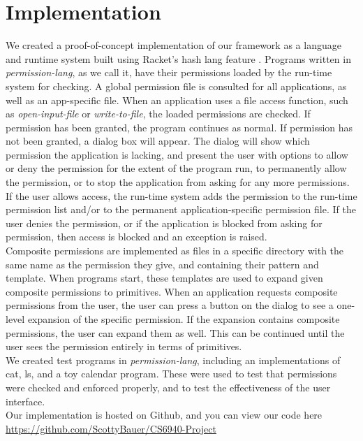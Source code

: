 \section{Implementation}\label{section:implementation}
We created a proof-of-concept implementation of our framework as a language and runtime system built using Racket's hash lang feature \cite{rakt}. Programs written in \textit{permission-lang}, as we call it, have their permissions loaded by the run-time system for checking.
A global permission file is consulted for all applications, as well as an app-specific file.  
When an application uses a file access function, such as \textit{open-input-file} or \textit{write-to-file}, the loaded permissions are checked.  
If permission has been granted, the program continues as normal.  
If permission has not been granted, a dialog box will appear.  
The dialog will show which permission the application is lacking, and present the user with options to allow or deny the permission for the extent of the program run, to permanently allow the permission, or to stop the application from asking for any more permissions.
If the user allows access, the run-time system adds the permission to the run-time permission list and/or to the permanent application-specific permission file.
If the user denies the permission, or if the application is blocked from asking for permission, then access is blocked and an exception is raised.
\\
\indent
Composite permissions are implemented as files in a specific directory with the same name as the permission they give, and containing their pattern and template.  When programs start, these templates are used to expand given composite permissions to primitives.  When an application requests composite permissions from the user, the user can press a button on the dialog to see a one-level expansion of the specific permission.  If the expansion contains composite permissions, the user can expand them as well.  This can be continued until the user sees the permission entirely in terms of primitives.
\\
\indent
We created test programs in \textit{permission-lang}, including an implementations of cat, ls, and a toy calendar program.
These were used to test that permissions were checked and enforced properly, and to test the effectiveness of the user interface.\\
Our implementation is hosted on Github, and you can view our code here \url{https://github.com/ScottyBauer/CS6940-Project}


